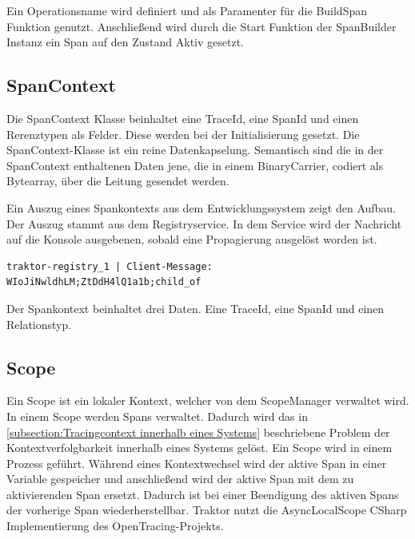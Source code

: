 Ein Operationsname wird definiert und als Paramenter für die BuildSpan Funktion genutzt. Anschließend wird durch die Start Funktion der SpanBuilder Instanz ein Span auf den Zustand Aktiv gesetzt.


\subsection{SpanContext}
\label{subsection:SpanContext}

Die SpanContext Klasse beinhaltet eine TraceId, eine SpanId und einen Rerenztypen als Felder. Diese werden bei der Initialisierung gesetzt. Die SpanContext-Klasse ist ein reine Datenkapselung. Semantisch sind die in der SpanContext enthaltenen Daten jene, die in einem BinaryCarrier, codiert als Bytearray, über die Leitung gesendet werden.

Ein Auszug eines Spankontexts aus dem Entwicklungssystem zeigt den Aufbau. Der Auszug stammt aus dem Registryservice. In dem Service wird der Nachricht auf die Konsole ausgebenen, sobald eine Propagierung ausgelöst worden ist.

\begin{minipage}[]{\textwidth}
	\begin{lstlisting}[frame=trBL]
	traktor-registry_1 | Client-Message: WIoJiNwldhLM;ZtDdH4lQ1a1b;child_of
	\end{lstlisting}
	\label{listing:SpanContext-Registry}
\end{minipage} 

Der Spankontext beinhaltet drei Daten. Eine TraceId, eine SpanId und einen Relationstyp.

\subsection{Scope}
\label{subsection:Scope}

Ein Scope ist ein lokaler Kontext, welcher von dem ScopeManager verwaltet wird. In einem Scope werden Spans verwaltet. Dadurch wird das in \cref{subsection:Tracingcontext innerhalb eines Systems} beschriebene Problem der Kontextverfolgbarkeit innerhalb eines Systems gelöst. Ein Scope wird in einem Prozess geführt. Während eines Kontextwechsel wird der aktive Span in einer Variable gespeicher und anschließend wird der aktive Span mit dem zu aktivierenden Span ersetzt. Dadurch ist bei einer Beendigung des aktiven Spans der vorherige Span wiederherstellbar. Traktor nutzt die AsyncLocalScope CSharp Implementierung des OpenTracing-Projekts.

